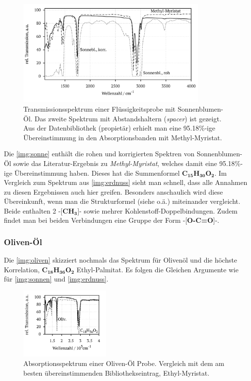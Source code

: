 \documentclass[a4paper,10pt,twocolumn]{article}
\newcommand{\tilt}[1]{\textit{#1}}
\newcommand{\fett}[1]{\textbf{#1}}
\begin{document}
			\begin{figure}
			\centering
				\includegraphics[width=0.85\textwidth]{Gruppe2A/sonnen.pdf}
				\caption{Transmissionsspektrum einer Fl\"ussigkeitsprobe mit Sonnenblumen-\"Ol. Das zweite Spektrum mit Abstandshaltern (\tilt{spacer}) ist gezeigt. Aus der Datenbibliothek (propiet\"ar) erhielt man eine 95.18\%-ige \"Ubereinstimmung in den Absorptionsbanden mit Methyl-Myristat.} 
				\label{img:sonnen}
			\end{figure}
		
		Die \autoref{img:sonne} enth\"alt die rohen und korrigierten Spektren von Sonnenblumen-\"Ol sowie das Literatur-Ergebnis zu \tilt{Methyl-Myristat}, welches damit eine 95.18\%-ige \"Ubereinstimmung haben. Dieses hat die Summenformel \fett{C}$_{\fett{15}}$\fett{H}$_{\fett{30}}$\fett{O}$_{\fett{2}}$. Im Vergleich zum Spektrum aus \autoref{img:erdnuss} sieht man schnell, dass alle Annahmen zu diesen Ergebnissen auch hier greifen. Besonders anschaulich wird diese \"Ubereinkunft, wenn man die Strukturformel (siehe \cite{FTIRStruk} o.\"a.) miteinander vergleicht. Beide enthalten 2 -[\fett{CH}$_{\fett{3}}$]- sowie mehrer Kohlenstoff-Doppelbindungen. Zudem findet man bei beiden Verbindungen eine Gruppe der Form -[\fett{O-C=O}]-.
		
		\subsubsection*{Oliven-\"Ol}

		Die \autoref{img:oliven} skizziert nochmals das Spektrum f\"ur Oliven\"ol und die h\"ochste Korrelation, \fett{C}$_{\fett{18}}$\fett{H}$_{\fett{36}}$\fett{O}$_{\fett{2}}$ Ethyl-Palmitat. Es folgen die Gleichen Argumente wie f\"ur \autoref{img:sonnen} und \autoref{img:erdnuss}.

			\begin{figure}[h]
			\centering
				\includegraphics[width=0.4\textwidth]{Gruppe2A/oliven.pdf}
				\caption{Absorptionsspektrum einer Oliven-\"Ol Probe. Vergleich mit dem am besten \"ubereinstimmenden Bibliothekseintrag, Ethyl-Myristat.}
				\label{img:oliven}
			\end{figure}
\end{document}
